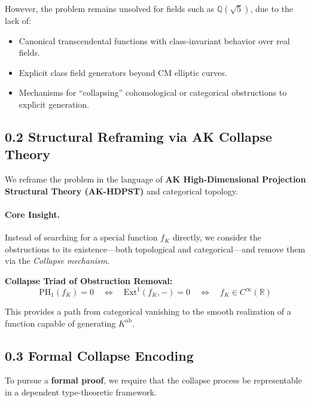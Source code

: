 \documentclass[11pt]{article}
\begin{document}
However, the problem remains unsolved for fields such as \( \mathbb{Q}(\sqrt{5}) \), due to the lack of:
\begin{itemize}
    \item Canonical transcendental functions with class-invariant behavior over real fields.
    \item Explicit class field generators beyond CM elliptic curves.
    \item Mechanisms for “collapsing” cohomological or categorical obstructions to explicit generation.
\end{itemize}

\subsection*{0.2 Structural Reframing via AK Collapse Theory}

We reframe the problem in the language of \textbf{AK High-Dimensional Projection Structural Theory (AK-HDPST)} and categorical topology.

\paragraph{Core Insight.}  
Instead of searching for a special function \( f_K \) directly, we consider the obstructions to its existence—both topological and categorical—and remove them via the \emph{Collapse mechanism}.

\vspace{1em}
\textbf{Collapse Triad of Obstruction Removal:}
\[
\boxed{
\mathrm{PH}_1(f_K) = 0 \quad \Leftrightarrow \quad \mathrm{Ext}^1(f_K, -) = 0 \quad \Leftrightarrow \quad f_K \in C^\infty(\mathbb{R})
}
\]

This provides a path from categorical vanishing to the smooth realization of a function capable of generating \( K^{\mathrm{ab}} \).

\subsection*{0.3 Formal Collapse Encoding}

To pursue a \textbf{formal proof}, we require that the collapse process be representable in a dependent type-theoretic framework.
\end{document}
